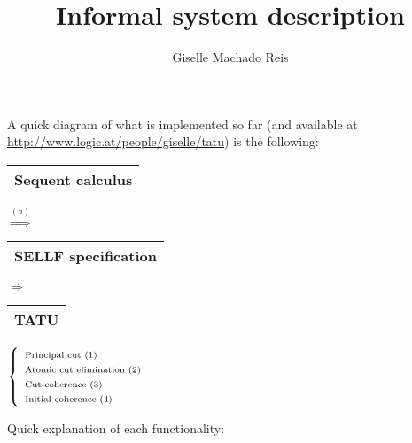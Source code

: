 \documentclass[a4paper, 11pt]{article}
\title{Informal system description}
\author{Giselle Machado Reis}
\begin{document}
\maketitle

A quick diagram of what is implemented so far (and available at
\url{http://www.logic.at/people/giselle/tatu}) is the following:

\vspace{1cm}

\begin{tabular}{|p{1.7cm}|}
\hline
Sequent calculus\\
\hline
\end{tabular}
$\overset{(a)}{\Longrightarrow}$
\begin{tabular}{|p{2.3cm}|}
\hline
SELLF specification\\
\hline
\end{tabular}
$\Longrightarrow$
\begin{tabular}{|p{1.5cm}|}
\hline
\textsf{\textbf{TATU}}\\
\hline
\end{tabular}
$
\left\{
  \begin{array}{l}
  \text{\scriptsize{Principal cut (1)}}\\
  \text{\scriptsize{Atomic cut elimination (2)}}\\
  \text{\scriptsize{Cut-coherence (3)}}\\
  \text{\scriptsize{Initial coherence (4)}}\\
  \end{array}
\right.
$

\vspace{1cm}

Quick explanation of each functionality:
\end{document}
